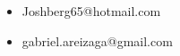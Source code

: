\documentclass[subfiles]{../main.tex}
\begin{document}
\begin{itemize}
\item {}Joshberg65@hotmail.com
\item {}gabriel.areizaga@gmail.com
\end{itemize}
\end{document}

